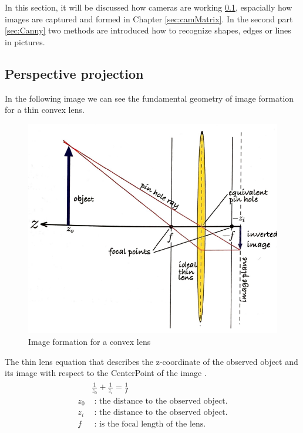 \documentclass[journal,final,a4paper,twoside]{PS}
\begin{document}
In this section, it will be discussed how cameras are working \ref{sec:projection}, espacially how images are captured and formed in Chapter \ref{sec:camMatrix}. In the second part \ref{sec:Canny} two methods are introduced how to recognize shapes, edges or lines in pictures.

\subsection{Perspective projection}
\label{sec:projection}
In the following image we can see the fundamental geometry of image formation for a thin convex lens.
\begin{figure}[h]
\begin{center}
\includegraphics[scale=0.5]{./pics/imageFormationGeometry.png}
\caption{Image formation for a convex lens \cite{Corke}}
\label{fig:imageGeometry}
\end{center}
\end{figure}
The thin lens equation that describes the z-coordinate of the observed object and its image with respect to the CenterPoint of the image \cite{Corke}.
\begin{align}\begin{split}
&\frac{1}{z_0}+\frac{1}{z_i}=\frac{1}{f}\\
z_0&\text{ : the distance to the observed object.}\\
z_i&\text{ : the distance to the observed object.}\\
f&\text{ : is the focal length of the lens.}\end{split}
\end{align}
\end{document}
